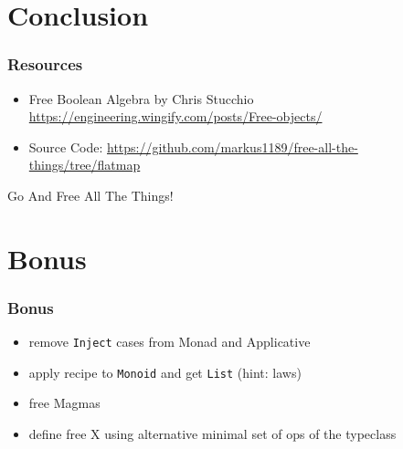 \documentclass{beamer}
\begin{document}
\section{Conclusion}\label{sec:conclusion}

\begin{frame}
  \frametitle{Resources}
  \begin{itemize}
  \item Free Boolean Algebra by Chris Stucchio \url{https://engineering.wingify.com/posts/Free-objects/}
  \item Source Code: \url{https://github.com/markus1189/free-all-the-things/tree/flatmap}
  \end{itemize}
\end{frame}

\begin{frame}
  \begin{center}
    \Huge
    Go And Free All The Things!
  \end{center}
\end{frame}

\begin{frame}
  \tableofcontents{}
\end{frame}

\appendix{}

\section*{Bonus}\label{sec:bonus}

\begin{frame}
  \frametitle{Bonus}
  \begin{itemize}
  \item remove \texttt{Inject} cases from Monad and Applicative
  \item apply recipe to \texttt{Monoid} and get \texttt{List} (hint: laws)
  \item free Magmas
  \item define free X using alternative minimal set of ops of the typeclass
  \end{itemize}
\end{frame}
\end{document}
